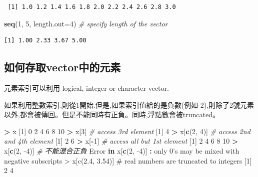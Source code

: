 \documentclass[]{book}
\newenvironment{Shaded}{\begin{snugshade}}{\end{snugshade}}
\newcommand{\CommentTok}[1]{\textcolor[rgb]{0.56,0.35,0.01}{\textit{#1}}}
\newcommand{\ControlFlowTok}[1]{\textcolor[rgb]{0.13,0.29,0.53}{\textbf{#1}}}
\newcommand{\DataTypeTok}[1]{\textcolor[rgb]{0.13,0.29,0.53}{#1}}
\newcommand{\DecValTok}[1]{\textcolor[rgb]{0.00,0.00,0.81}{#1}}
\newcommand{\KeywordTok}[1]{\textcolor[rgb]{0.13,0.29,0.53}{\textbf{#1}}}
\newcommand{\NormalTok}[1]{#1}
\newcommand{\OperatorTok}[1]{\textcolor[rgb]{0.81,0.36,0.00}{\textbf{#1}}}
\newcommand{\StringTok}[1]{\textcolor[rgb]{0.31,0.60,0.02}{#1}}
\theoremstyle{definition}
\theoremstyle{definition}
\theoremstyle{definition}
\theoremstyle{remark}
\begin{document}
\begin{verbatim}
 [1] 1.0 1.2 1.4 1.6 1.8 2.0 2.2 2.4 2.6 2.8 3.0
\end{verbatim}

\begin{Shaded}
\begin{Highlighting}[]
 \KeywordTok{seq}\NormalTok{(}\DecValTok{1}\NormalTok{, }\DecValTok{5}\NormalTok{, }\DataTypeTok{length.out=}\DecValTok{4}\NormalTok{)    }\CommentTok{# specify length of the vector}
\end{Highlighting}
\end{Shaded}

\begin{verbatim}
[1] 1.00 2.33 3.67 5.00
\end{verbatim}

\hypertarget{vector}{%
\subsection{如何存取vector中的元素}\label{vector}}

元素索引可以利用 logical, integer or character vector.

如果利用整數索引,則從1開始.但是,如果索引值給的是負數(例如-2),則除了2號元素以外,都會被傳回。但是不能同時有正負。同時,浮點數會被truncated。

\begin{Shaded}
\begin{Highlighting}[]
\OperatorTok{>}\StringTok{ }\NormalTok{x}
\NormalTok{[}\DecValTok{1}\NormalTok{]  }\DecValTok{0}  \DecValTok{2}  \DecValTok{4}  \DecValTok{6}  \DecValTok{8} \DecValTok{10}
\OperatorTok{>}\StringTok{ }\NormalTok{x[}\DecValTok{3}\NormalTok{]           }\CommentTok{# access 3rd element}
\NormalTok{[}\DecValTok{1}\NormalTok{] }\DecValTok{4}
\OperatorTok{>}\StringTok{ }\NormalTok{x[}\KeywordTok{c}\NormalTok{(}\DecValTok{2}\NormalTok{, }\DecValTok{4}\NormalTok{)]     }\CommentTok{# access 2nd and 4th element}
\NormalTok{[}\DecValTok{1}\NormalTok{] }\DecValTok{2} \DecValTok{6}
\OperatorTok{>}\StringTok{ }\NormalTok{x[}\OperatorTok{-}\DecValTok{1}\NormalTok{]          }\CommentTok{# access all but 1st element}
\NormalTok{[}\DecValTok{1}\NormalTok{]  }\DecValTok{2}  \DecValTok{4}  \DecValTok{6}  \DecValTok{8} \DecValTok{10}
\OperatorTok{>}\StringTok{ }\NormalTok{x[}\KeywordTok{c}\NormalTok{(}\DecValTok{2}\NormalTok{, }\DecValTok{-4}\NormalTok{)]    }\CommentTok{# 不能混合正負}
\NormalTok{Error }\ControlFlowTok{in}\NormalTok{ x[}\KeywordTok{c}\NormalTok{(}\DecValTok{2}\NormalTok{, }\DecValTok{-4}\NormalTok{)] }\OperatorTok{:}\StringTok{ }\NormalTok{only }\DecValTok{0}\StringTok{'s may be mixed with negative subscripts}
\StringTok{> x[c(2.4, 3.54)]    # real numbers are truncated to integers}
\StringTok{[1] 2 4}
\end{Highlighting}
\end{Shaded}
\end{document}
